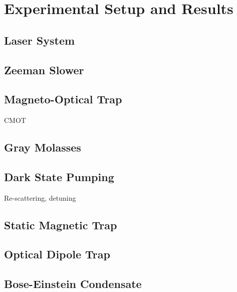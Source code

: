\chapter{Experimental Setup and Results}

\section{Laser System}


\section{Zeeman Slower}

\section{Magneto-Optical Trap}

CMOT

\section{Gray Molasses}

\section{Dark State Pumping}

Re-scattering, detuning

\section{Static Magnetic Trap}

\section{Optical Dipole Trap}

\section{Bose-Einstein Condensate}
